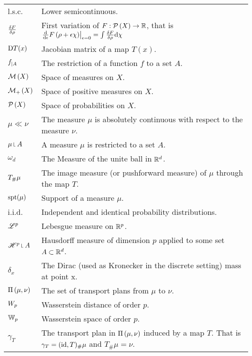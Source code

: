\begin{longtable*}{ p{0.1\textwidth} p{0.8\textwidth} }
	l.s.c. & Lower semicontinuous. \\
	$\Variation{F}{\rho}$ &  First variation of $F:\PlanSp\parentheses{X} \rightarrow \Real$, that is $\left.\dev{\epsilon}F\left(\rho +\epsilon\chi\right)\right|_{\epsilon=0}=\int\Variation{F}{\rho}\diff\chi$\\
	$\D T(x)$ & Jacobian matrix of a map $T(x)$. \\
	$\domainrestr{A}{f}$ & The restriction of a function $f$ to a set $A$. \\
	$\MeasureSp\parentheses{X}$ & Space of measures on $X$. \\
	$\PMeasureSp\parentheses{X}$ & Space of positive measures on $X$. \\
	$\PlanSp\parentheses{X}$ & Space of probabilities on $X$. \\	
	$\mu \ll\nu$ & The measure $\mu$ is absolutely continuous with respect to the measure $\nu$. \\
	$\mu \measurerestr A$ & A measure $\mu$ is restricted to a set $A$.\\
	$\omega_d$ & The Measure of the unite ball in $\Real^d$. \\
	$\Tmeasure{\mu}{T}$ &  The image measure (or pushforward measure) of $\mu$ through the map $T$.\\
	$\spt(\mu)$& Support of a measure $\mu$.\\
	i.i.d. & Independent and identical probability distributions.\\
	$\Lebesgue^p$ & Lebesgue measure on $\Real^p$.\\
	$\Hausdorff^p\measurerestr A$ & Hausdorff measure of dimension $p$ applied to some set $A \subset \Real^d$. \\
	$\delta_x$ & The Dirac (used as Kronecker in the discrete setting) mass at point x. \\
	$\TransPlansSet{\mu}{\nu}$ & The set of transport plans from $\mu$ to $\nu$.\\
	$\WassersteinDist{p}$ & Wasserstein distance of order $p$. \\	
	$\WassersteinSp{p}$ & Wasserstein space of order $p$.\\
 	$\gamma_T$ & The transport plan in $\TransPlansSet{\mu}{\nu}$ induced by a map $T$. That is $\gamma_T = (\id, T)_\#\mu$ and $T_\#\mu=\nu$. \\

\end{longtable*}

